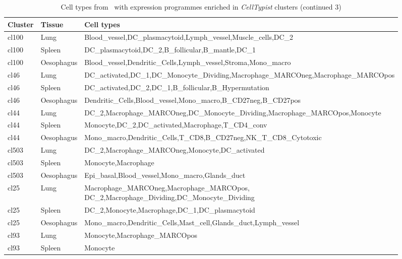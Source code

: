 \begin{table}[pht!] %
\scriptsize
\caption[Cell types from~\citep{madissoon_lung_2019} with expression programmes enriched in \textit{CellTypist} clusters (continued 3)]{Cell types from~\citep{madissoon_lung_2019} with expression programmes enriched in \textit{CellTypist} clusters (continued 3)}
\centering
\label{table:tab_mad_match3}
\begin{tabular}{lll}
  \toprule
Cluster & Tissue & Cell types \\ 
  \midrule
  cl100 & Lung & Blood\_vessel,DC\_plasmacytoid,Lymph\_vessel,Muscle\_cells,DC\_2 \\ 
  cl100 & Spleen & DC\_plasmacytoid,DC\_2,B\_follicular,B\_mantle,DC\_1 \\ 
  cl100 & Oesophagus & Blood\_vessel,Dendritic\_Cells,Lymph\_vessel,Stroma,Mono\_macro \\ 
  cl46 & Lung & DC\_activated,DC\_1,DC\_Monocyte\_Dividing,Macrophage\_MARCOneg,Macrophage\_MARCOpos \\ 
  cl46 & Spleen & DC\_activated,DC\_2,DC\_1,B\_follicular,B\_Hypermutation \\ 
  cl46 & Oesophagus & Dendritic\_Cells,Blood\_vessel,Mono\_macro,B\_CD27neg,B\_CD27pos \\ 
  cl44 & Lung & DC\_2,Macrophage\_MARCOneg,DC\_Monocyte\_Dividing,Macrophage\_MARCOpos,Monocyte \\ 
  cl44 & Spleen & Monocyte,DC\_2,DC\_activated,Macrophage,T\_CD4\_conv \\ 
  cl44 & Oesophagus & Mono\_macro,Dendritic\_Cells,T\_CD8,B\_CD27neg,NK\_T\_CD8\_Cytotoxic \\ 
  cl503 & Lung & DC\_2,Macrophage\_MARCOneg,Monocyte,DC\_activated \\ 
  cl503 & Spleen & Monocyte,Macrophage \\ 
  cl503 & Oesophagus & Epi\_basal,Blood\_vessel,Mono\_macro,Glands\_duct \\ 
  cl25 & Lung & \specialcell[t]{Macrophage\_MARCOneg,Macrophage\_MARCOpos,\\DC\_2,Macrophage\_Dividing,DC\_Monocyte\_Dividing} \\ 
  cl25 & Spleen & DC\_2,Monocyte,Macrophage,DC\_1,DC\_plasmacytoid \\ 
  cl25 & Oesophagus & Mono\_macro,Dendritic\_Cells,Mast\_cell,Glands\_duct,Lymph\_vessel \\ 
  cl93 & Lung & Monocyte,Macrophage\_MARCOpos \\ 
  cl93 & Spleen & Monocyte \\ 

\end{tabular}
\end{table}
